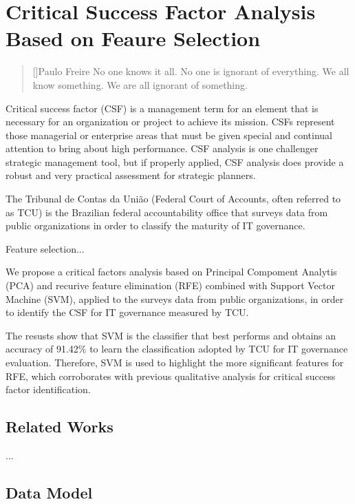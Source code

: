\chapter{Critical Success Factor Analysis Based on Feaure Selection}
\label{ch:2_pca_svm_cfa}

\begin{quotation}[]{Paulo Freire}
No one knows it all. No one is ignorant of everything. We all know something. We are all ignorant of something.
\end{quotation}

Critical success factor (CSF) is a management term for an element that is necessary for an organization or project to achieve its mission. CSFs represent those managerial or enterprise areas that must be given special and continual attention to bring about high performance. CSF analysis is one challenger strategic management tool, but if properly applied, CSF analysis does provide a robust and very practical assessment for strategic planners.

The Tribunal de Contas da União (Federal Court of Accounts, often referred to as TCU) is the Brazilian federal accountability office that surveys data from public organizations in order to classify the maturity of IT governance. 

Feature selection...

We propose a critical factors analysis based on Principal Compoment Analytis (PCA) and recurive feature elimination (RFE) combined with Support Vector Machine (SVM), applied to the surveys data from public organizations, in order to identify the CSF for IT governance measured by TCU. 

The resusts show that SVM is the classifier that best performs and obtains an accuracy of 91.42\% to learn the classification adopted by TCU for IT governance evaluation. Therefore, SVM is used to highlight the more significant features for RFE, which corroborates with previous qualitative analysis for critical success factor identification.

\section{Related Works}
\label{sec:relatedworks}

...

\section{Data Model}
\label{sec:datamodel}

